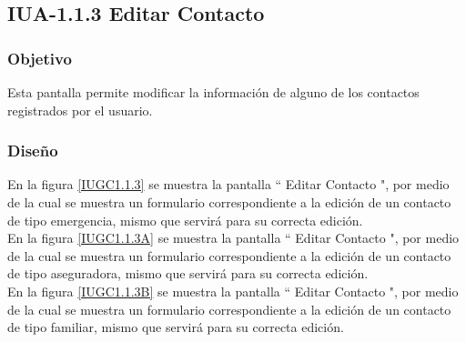 \subsection{IUA-1.1.3 Editar Contacto}

\subsubsection{Objetivo}

	
Esta pantalla permite modificar la información de alguno de los contactos registrados por el usuario.
\subsubsection{Diseño}


    En la figura \ref{IUGC1.1.3} se muestra la pantalla `` Editar Contacto ", por medio de la cual se muestra un formulario correspondiente a la edición de un contacto de tipo emergencia, mismo que servirá para su correcta edición.\\

    En la figura \ref{IUGC1.1.3A} se muestra la pantalla `` Editar Contacto ", por medio de la cual se muestra un formulario correspondiente a la edición de un contacto de tipo aseguradora, mismo que servirá para su correcta edición.\\

    En la figura \ref{IUGC1.1.3B} se muestra la pantalla `` Editar Contacto ", por medio de la cual se muestra un formulario correspondiente a la edición de un contacto de tipo familiar, mismo que servirá para su correcta edición.\\
    

